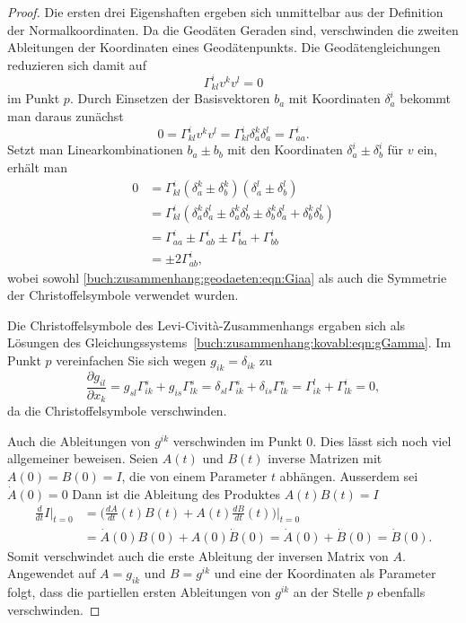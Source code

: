 \begin{proof}
Die ersten drei Eigenshaften ergeben sich unmittelbar aus der Definition
der Normalkoordinaten.
Da die Geodäten Geraden sind, verschwinden die zweiten Ableitungen
der Koordinaten eines Geodätenpunkts.
Die Geodätengleichungen reduzieren sich damit auf
\[
\Gamma^i_{kl} v^kv^l = 0
\]
im Punkt $p$.
Durch Einsetzen der Basisvektoren $b_a$ mit Koordinaten $\delta_a^i$
bekommt man daraus zunächst
\begin{equation}
0
=
\Gamma^i_{kl}v^kv^l
=
\Gamma^i_{kl}\delta_a^k\delta_a^l
=
\Gamma^i_{aa}.
\label{buch:zusammenhang:geodaeten:eqn:Giaa}
\end{equation}
Setzt man Linearkombinationen $b_a\pm b_b$ mit den Koordinaten
$\delta_a^i\pm \delta_b^i$ für $v$ ein, erhält man
\begin{align*}
0
&=
\Gamma^i_{kl} (\delta_a^k \pm \delta_b^k)(\delta_a^l \pm \delta_b^l)
\\
&=
\Gamma^i_{kl}(
    \delta_a^k\delta_a^l
\pm \delta_a^k\delta_b^l
\pm \delta_b^k\delta_a^l
  + \delta_b^k\delta_b^l
)
\\
&=
\Gamma^i_{aa}
\pm
\Gamma^i_{ab}
\pm
\Gamma^i_{ba}
+
\Gamma^i_{bb}
\\
&=
\pm
2
\Gamma^i_{ab},
\end{align*}
wobei sowohl
\eqref{buch:zusammenhang:geodaeten:eqn:Giaa}
als auch die Symmetrie der Christoffelsymbole verwendet wurden.

Die Christoffelsymbole des Levi-Cività-Zusammenhangs ergaben sich
als Lösungen des Gleichungssystems~\ref{buch:zusammenhang:kovabl:eqn:gGamma}.
Im Punkt $p$ vereinfachen Sie sich wegen $g_{ik}=\delta_{ik}$ zu
\[
\frac{\partial g_{il}}{\partial x_k}
=
g_{sl}\Gamma^s_{ik}
+
g_{is}\Gamma^s_{lk}
=
\delta_{sl}\Gamma^s_{ik}
+
\delta_{is}\Gamma^s_{lk}
=
\Gamma^l_{ik}
+
\Gamma^i_{lk}
=
0,
\]
da die Christoffelsymbole verschwinden.

Auch die Ableitungen von $g^{ik}$ verschwinden im Punkt $0$.
Dies lässt sich noch viel allgemeiner beweisen.
Seien $A(t)$ und $B(t)$ inverse Matrizen mit $A(0)=B(0)=I$, die von einem
Parameter $t$ abhängen.
Ausserdem sei $\dot{A}(0)=0$
Dann ist die Ableitung des Produktes $A(t)B(t)=I$
\begin{align*}
\frac{d}{dt}I\bigg|_{t=0}
&=
\biggl(
\frac{dA}{dt}(t) B(t)
+
A(t)
\frac{dB}{dt}(t)
\biggr)\bigg|_{t=0}
\\
&=
\dot{A}(0)
B(0)
+
A(0)
\dot{B}(0)
=
\dot{A}(0)
+
\dot{B}(0)
=
\dot{B}(0).
\end{align*}
Somit verschwindet auch die erste Ableitung der inversen Matrix von $A$.
Angewendet auf $A=g_{ik}$ und $B=g^{ik}$ und eine der Koordinaten als
Parameter folgt, dass die partiellen ersten Ableitungen von $g^{ik}$
an der Stelle $p$ ebenfalls verschwinden.
\end{proof}

